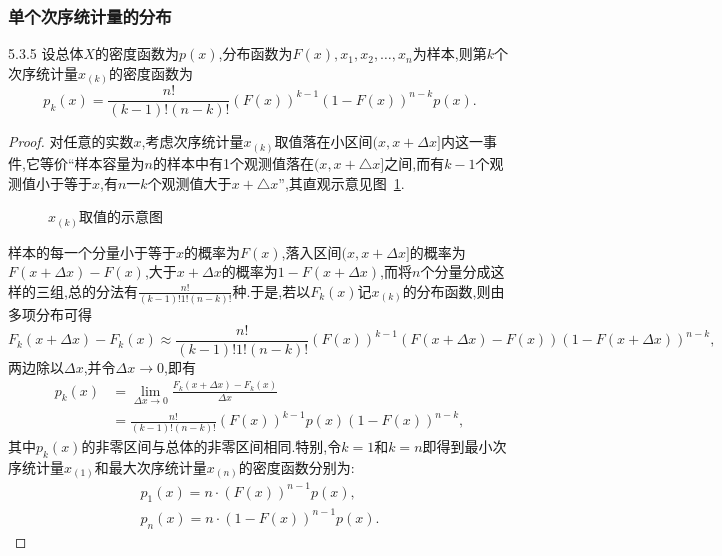 \subsubsection{单个次序统计量的分布}
\begin{theorem}{}{5.3.5}
设总体$X$的密度函数为$p(x)$,分布函数为$F(x),x_1,x_2,\dotsc,x_n$为样本,则第$k$个次序统计量$x_{(k)}$的密度函数为
\begin{equation}\label{eq:5.3.13}
p_k(x)=\frac{n!}{(k-1)!(n-k)!}(F(x))^{k-1}(1-F(x))^{n-k}p(x).
\end{equation}
\end{theorem}
\begin{proof}
对任意的实数$x$,考虑次序统计量$x_{(k)}$取值落在小区间$(x,x+\Delta x]$内这一事件,它等价``样本容量为$n$的样本中有1个观测值落在$(x,x+△x]$之间,而有$k-1$个观测值小于等于$x$,有$n一k$个观测值大于$x+△x$'',其直观示意见图~\ref{fig:5.3.5}.
\begin{figure}[!htp]
  \centering
{}
  \caption{$x_{(k)}$取值的示意图}\label{fig:5.3.5}
\end{figure}

样本的每一个分量小于等于$x$的概率为$F(x)$,落入区间$(x,x+\Delta x]$的概率为$F(x+\Delta x)-F(x)$,大于$x+\Delta x$的概率为$1-F(x+\Delta x)$,而将$n$个分量分成这样的三组,总的分法有$\frac{n!}{(k-1)!1!(n-k)!}$种.于是,若以$F_k(x)$记$x_{(k)}$的分布函数,则由多项分布可得
\[F_k(x+\Delta x)-F_k(x)\approx\frac{n!}{(k-1)!1!(n-k)!}(F(x))^{k-1}(F(x+\Delta x)-F(x))(1-F(x+\Delta x))^{n-k},\]
两边除以$\Delta x$,并令$\Delta x\to0$,即有
\begin{align*}
p_k(x)&=\lim_{\Delta x\to0}\frac{F_k(x+\Delta x)-F_k(x)}{\Delta x}\\
&=\frac{n!}{(k-1)!(n-k)!}(F(x))^{k-1}p(x)(1-F(x))^{n-k},
\end{align*}
其中$p_k(x)$的非零区间与总体的非零区间相同.特别,令$k=1$和$k=n$即得到最小次序统计量$x_{(1)}$和最大次序统计量$x_{(n)}$的密度函数分别为:
\begin{gather}
p_1(x)=n\cdot(F(x))^{n-1}p(x),\label{eq:5.3.14}\\
p_n(x)=n\cdot(1-F(x))^{n-1}p(x).\label{eq:5.3.15}
\end{gather}
\end{proof}
